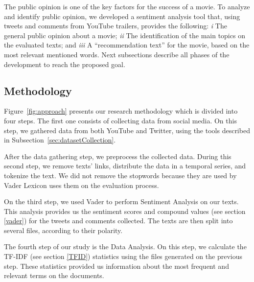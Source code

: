 The public opinion is one of the key factors for the success of a movie. To analyze and identify public opinion, we developed a sentiment analysis tool that, using tweets and comments from YouTube trailers, provides the following: \textit{i} The general public opinion about a movie; \textit{ii} The identification of the main topics on the evaluated texts; and \textit{iii} A ``recommendation text'' for the movie, based on the most relevant mentioned words. Next subsections describe all phases of the development to reach the proposed goal.

\subsection{Methodology}

Figure~\ref{fig:approach} presents our research methodology 
which is divided into four steps. The first one consists of collecting data from social media. On this step, we gathered data from both YouTube and Twitter, using the tools described in Subsection~\ref{sec:datasetCollection}. 

After the data gathering step, we preprocess the collected data. During this second step, we remove texts' links, distribute the data in a temporal series, and tokenize the text. We did not remove the stopwords because they are used by Vader Lexicon uses them on the evaluation process.

On the third step, we used Vader to perform Sentiment Analysis on our texts. This analysis provides us the sentiment scores and compound values (see section \ref{vader}) for the tweets and comments collected. The texts are then split into several files, according to their polarity. 

The fourth step of our study is the Data Analysis. On this step, we calculate the TF-IDF (see section \ref{TFID}) statistics using the files generated on the previous step. These statistics provided us information about the most frequent and relevant terms on the documents. 

